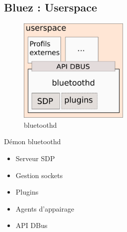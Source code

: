 \subsection{Bluez : Userspace}
\begin{frame}
\begin{minipage}[t]{0.60\linewidth}
	\begin{figure}
		\includegraphics[height=5cm]{img/bluetoothd.png}
		\caption{bluetoothd}
	\end{figure}
\end{minipage}
\begin{minipage}[t]{0.30\linewidth}
	\begin{block}{Démon bluetoothd}
		\begin{itemize}
			\item Serveur SDP
			\item Gestion sockets
			\item Plugins
			\item Agents d'appairage
			\item API DBus
		\end{itemize}
	\end{block}
\end{minipage}
\end{frame}


